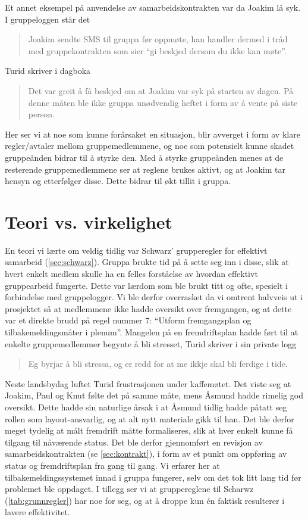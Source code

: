 Et annet eksempel på anvendelse av samarbeidskontrakten var da Joakim lå syk. I
gruppeloggen står det
\begin{quote}
Joakim sendte SMS til gruppa før oppmøte, han handler
dermed i tråd med gruppekontrakten som sier ``gi beskjed dersom du ikke kan
møte''.
\end{quote}
 Turid skriver i dagboka 
 \begin{quote}
 Det var greit å få beskjed om at Joakim var
syk på starten av dagen. På denne måten ble ikke gruppa unødvendig heftet i form
av å vente på siste person. 
\end{quote}
Her ser vi at noe som kunne forårsaket en situasjon, blir avverget i form av 
klare regler/avtaler mellom
gruppemedlemmene, og noe som potensielt kunne skadet gruppeånden bidrar til å
styrke den. Med å styrke gruppeånden menes at de resterende gruppemedlemmene ser
at reglene brukes aktivt, og at Joakim tar hensyn og etterfølger disse. Dette
bidrar til økt tillit i gruppa.\\

\section{Teori vs. virkelighet}
En teori vi lærte om veldig tidlig var Schwarz' grupperegler for effektivt
samarbeid (\cref{sec:schwarz}). Gruppa brukte tid på å sette seg inn i disse, slik at
hvert enkelt medlem skulle ha en felles forståelse av hvordan effektivt
gruppearbeid fungerte. Dette var lærdom som ble brukt titt og ofte, spesielt i
forbindelse med gruppelogger. Vi ble derfor overrasket da vi omtrent halvveis ut
i prosjektet så at medlemmene ikke hadde oversikt over fremgangen, og at dette var et
direkte brudd på regel nummer 7: ``Utform fremgangsplan og tilbakemeldingsmåter
i plenum''. Mangelen på en fremdriftsplan hadde ført til at enkelte
gruppemedlemmer begynte å bli stresset, Turid skriver i sin private logg \\
\begin{quote}
Eg byrjar å bli stressa, og er redd for at me ikkje skal bli ferdige i tide.
\end{quote}

Neste landsbydag luftet Turid frustrasjonen under kaffemøtet. Det viste seg at
Joakim, Paul og Knut følte det på samme måte, mens Åsmund hadde rimelig god
oversikt. Dette hadde sin naturlige årsak i at Åsmund tidlig hadde påtatt seg
rollen som layout-ansvarlig, og at alt nytt materiale gikk til han. Det ble
derfor meget tydelig at målt fremdrift måtte formaliseres, slik at hver enkelt
kunne få tilgang til nåværende status. Det ble derfor gjennomført en revisjon
av samarbeidskontrakten (se \cref{sec:kontrakt}), i form av et punkt om oppføring av
status og fremdriftsplan fra gang til gang. Vi erfarer her at
tilbakemeldingssystemet innad i gruppa fungerer, selv om det tok litt lang tid
før problemet ble oppdaget. I tillegg ser vi at gruppereglene til Scharwz
(\cref{tab:grunnregler}) har noe for seg, og at å droppe kun én faktisk
resulterer i lavere effektivitet.\\ 


